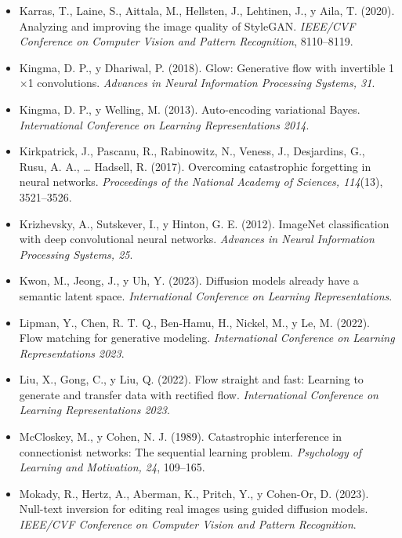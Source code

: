 \documentclass[12pt, a4paper, twoside]{book}
\begin{document}
\begin{itemize}[leftmargin=1.5em, itemsep=4pt]
\item Karras, T., Laine, S., Aittala, M., Hellsten, J., Lehtinen, J., y Aila, T. (2020). Analyzing and improving the image quality of StyleGAN. \textit{IEEE/CVF Conference on Computer Vision and Pattern Recognition}, 8110--8119.

\item Kingma, D. P., y Dhariwal, P. (2018). Glow: Generative flow with invertible 1$\times$1 convolutions. \textit{Advances in Neural Information Processing Systems, 31}.

\item Kingma, D. P., y Welling, M. (2013). Auto-encoding variational Bayes. \textit{International Conference on Learning Representations 2014}.

\item Kirkpatrick, J., Pascanu, R., Rabinowitz, N., Veness, J., Desjardins, G., Rusu, A. A., \ldots{} Hadsell, R. (2017). Overcoming catastrophic forgetting in neural networks. \textit{Proceedings of the National Academy of Sciences, 114}(13), 3521--3526.

\item Krizhevsky, A., Sutskever, I., y Hinton, G. E. (2012). ImageNet classification with deep convolutional neural networks. \textit{Advances in Neural Information Processing Systems, 25}.

\item Kwon, M., Jeong, J., y Uh, Y. (2023). Diffusion models already have a semantic latent space. \textit{International Conference on Learning Representations}.

\item Lipman, Y., Chen, R. T. Q., Ben-Hamu, H., Nickel, M., y Le, M. (2022). Flow matching for generative modeling. \textit{International Conference on Learning Representations 2023}.

\item Liu, X., Gong, C., y Liu, Q. (2022). Flow straight and fast: Learning to generate and transfer data with rectified flow. \textit{International Conference on Learning Representations 2023}.

\item McCloskey, M., y Cohen, N. J. (1989). Catastrophic interference in connectionist networks: The sequential learning problem. \textit{Psychology of Learning and Motivation, 24}, 109--165.

\item Mokady, R., Hertz, A., Aberman, K., Pritch, Y., y Cohen-Or, D. (2023). Null-text inversion for editing real images using guided diffusion models. \textit{IEEE/CVF Conference on Computer Vision and Pattern Recognition}.


\end{itemize}
\end{document}
